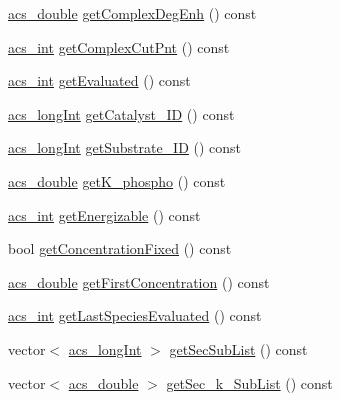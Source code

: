 \begin{DoxyCompactItemize}
\item 
\hyperlink{acs__headers_8h_ab776853a005fcbf56af0424a2a4dd607}{acs\-\_\-double} \hyperlink{classspecies_a2870bc4874efda0a1a079eb2b326ecd9}{get\-Complex\-Deg\-Enh} () const 
\item 
\hyperlink{acs__headers_8h_a8d277355641a098190360234e2ebde35}{acs\-\_\-int} \hyperlink{classspecies_a4c87285bf983ddd5635b58ce82d02a80}{get\-Complex\-Cut\-Pnt} () const 
\item 
\hyperlink{acs__headers_8h_a8d277355641a098190360234e2ebde35}{acs\-\_\-int} \hyperlink{classspecies_acb08d02f3dcadd9f422d435219d1dc57}{get\-Evaluated} () const 
\item 
\hyperlink{acs__headers_8h_a19319d75f02db4308bc5c0026d98cd85}{acs\-\_\-long\-Int} \hyperlink{classspecies_a4be19a81a4de43016316832fdf8b5f35}{get\-Catalyst\-\_\-\-I\-D} () const 
\item 
\hyperlink{acs__headers_8h_a19319d75f02db4308bc5c0026d98cd85}{acs\-\_\-long\-Int} \hyperlink{classspecies_a3bc786de75d9c6235c75eeda10b01b8d}{get\-Substrate\-\_\-\-I\-D} () const 
\item 
\hyperlink{acs__headers_8h_ab776853a005fcbf56af0424a2a4dd607}{acs\-\_\-double} \hyperlink{classspecies_a22a114de19bb6c6d550b967797529e1d}{get\-K\-\_\-phospho} () const 
\item 
\hyperlink{acs__headers_8h_a8d277355641a098190360234e2ebde35}{acs\-\_\-int} \hyperlink{classspecies_ad234e523f16507008b64f2d872d9792f}{get\-Energizable} () const 
\item 
bool \hyperlink{classspecies_aa2b24de5a97f1e06d359ab5b63817d98}{get\-Concentration\-Fixed} () const 
\item 
\hyperlink{acs__headers_8h_ab776853a005fcbf56af0424a2a4dd607}{acs\-\_\-double} \hyperlink{classspecies_a6773ef96109c27ddd4afa78b87b2fcd3}{get\-First\-Concentration} () const 
\item 
\hyperlink{acs__headers_8h_a8d277355641a098190360234e2ebde35}{acs\-\_\-int} \hyperlink{classspecies_ace7de26d4e33dddfa78f2c624cfb3666}{get\-Last\-Species\-Evaluated} () const 
\item 
vector$<$ \hyperlink{acs__headers_8h_a19319d75f02db4308bc5c0026d98cd85}{acs\-\_\-long\-Int} $>$ \hyperlink{classspecies_ada53efcec76e8f241b15fd6c76d4fb79}{get\-Sec\-Sub\-List} () const 
\item 
vector$<$ \hyperlink{acs__headers_8h_ab776853a005fcbf56af0424a2a4dd607}{acs\-\_\-double} $>$ \hyperlink{classspecies_a30f77a52d0c75f02f6b4c269b5cf702d}{get\-Sec\-\_\-k\-\_\-\-Sub\-List} () const 
\item 

\end{DoxyCompactItemize}
